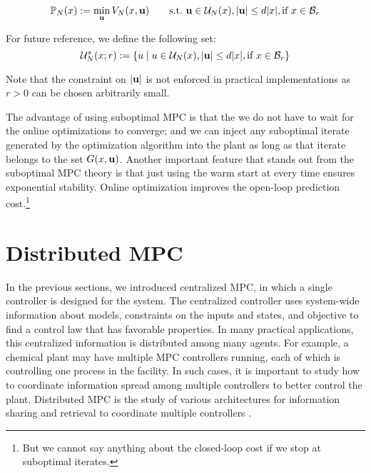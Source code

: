 \begin{equation}
\label{eq:mpc:suboptimal:PNx}
\mathbb{P}_N(x) := \min_{\mathbf{u}}{V_N(x,\mathbf{u})} \qquad \text{s.t.~} \mathbf{u}
\in \mathcal{U}_N(x), \vert \mathbf{u} \vert \leq d \vert x \vert, \text{if~} x \in
\mathcal{B}_r
\end{equation}

For future reference, we define the following set:
\begin{equation}
\label{eq:mpc:UN_sub}
\mathcal{U}_N^{s}(x;r) := \left\lbrace u \mid u \in \mathcal{U}_N(x),\vert \mathbf{u} \vert \leq d \vert x \vert, \text{if~} x \in
\mathcal{B}_r \right\rbrace
\end{equation}

Note that the constraint on $\vert \mathbf{u} \vert$ is not enforced in practical
implementations as $r>0$ can be chosen arbitrarily small. 

The advantage of using suboptimal MPC is that the we do not have to
wait for the online optimizations to 
converge; and we can inject any suboptimal iterate generated by the
optimization algorithm into the plant as long as that iterate belongs
to the set $G(x,\mathbf{u})$. Another important feature that stands out from
the suboptimal MPC theory is that just using the warm start at every
time ensures exponential stability. Online optimization improves the
open-loop prediction cost.\footnote{But we cannot say anything about
  the closed-loop cost if we stop at suboptimal iterates.}




\section{Distributed MPC}
\label{sec:mpc:distributed}
In the previous sections, we introduced centralized MPC, in which a
single controller is designed for the system. The centralized
controller uses system-wide information about models, constraints on
the inputs and states, and objective to find a control law that has favorable properties. In many practical
applications, this centralized information is distributed among many
agents. For example, a chemical plant may have multiple MPC
controllers running, each of which is controlling one process in the
facility. In such cases, it is important to study how to coordinate
information spread among multiple controllers to better control the
plant. Distributed MPC is the study of various architectures for
information sharing and retrieval to coordinate multiple controllers
\citep{scattolini:2009}. 

